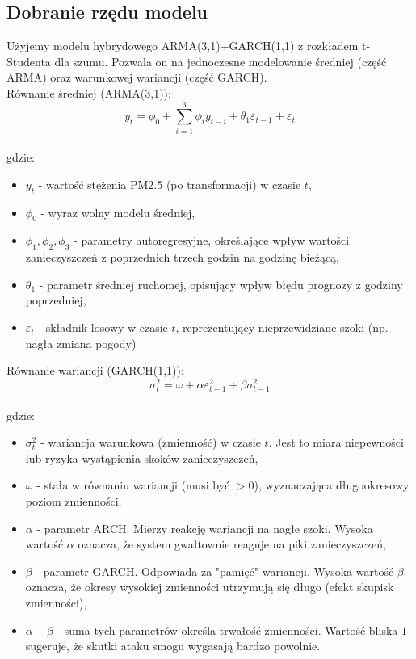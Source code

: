 \documentclass{article}
\begin{document}
\subsection{Dobranie rzędu modelu}
Użyjemy modelu hybrydowego ARMA(3,1)+GARCH(1,1) z rozkładem t-Studenta dla szumu. Pozwala on na jednoczesne modelowanie średniej (część ARMA) oraz warunkowej wariancji (część GARCH). \\
Równanie średniej (ARMA(3,1)):$$y_t = \phi_0 + \sum_{i=1}^3 \phi_i y_{t-i} + \theta_1 \varepsilon_{t-1} + \varepsilon_t$$ \\
gdzie:

\begin{itemize}
    \item $y_t$ - wartość stężenia PM2.5 (po transformacji) w czasie $t$,
    \item $\phi_0$ - wyraz wolny modelu średniej,
    \item $\phi_1, \phi_2,\phi_3$ - parametry autoregresyjne, określające wpływ wartości zanieczyszczeń z poprzednich trzech godzin na godzinę bieżącą,
    \item $\theta_1$ - parametr średniej ruchomej, opisujący wpływ błędu prognozy z godziny poprzedniej,
    \item $\varepsilon_t$ - składnik losowy w czasie $t$, reprezentujący nieprzewidziane szoki (np. nagła zmiana pogody) 
\end{itemize}

Równanie wariancji (GARCH(1,1)):$$\sigma_t^2 = \omega + \alpha \varepsilon_{t-1}^2 + \beta \sigma_{t-1}^2$$ \\
gdzie:

\begin{itemize}
    \item $\sigma_t^2$ -  wariancja warunkowa (zmienność) w czasie $t$. Jest to miara niepewności lub ryzyka wystąpienia skoków zanieczyszczeń,
    \item $\omega$ - stała w równaniu wariancji (musi być $> 0$), wyznaczająca długookresowy poziom zmienności,
    \item $\alpha$ - parametr ARCH. Mierzy reakcję wariancji na nagłe szoki. Wysoka wartość $\alpha$ oznacza, że system gwałtownie reaguje na piki zanieczyszczeń,
    \item $\beta$ - parametr GARCH. Odpowiada za "pamięć" wariancji. Wysoka wartość $\beta$ oznacza, że okresy wysokiej zmienności utrzymują się długo (efekt skupisk zmienności),
    \item $\alpha + \beta$ - suma tych parametrów określa trwałość zmienności. Wartość bliska $1$ sugeruje, że skutki ataku smogu wygasają bardzo powolnie.
\end{itemize}
\end{document}
